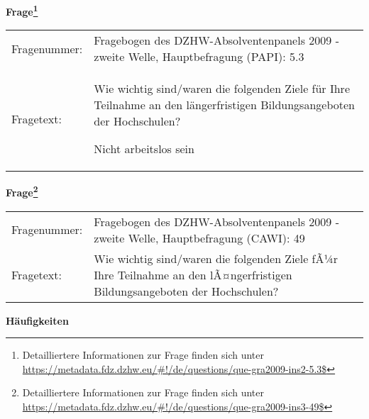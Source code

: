 				\vspace*{0.5cm}
                \noindent\textbf{Frage\footnote{Detailliertere Informationen zur Frage finden sich unter
		              \url{https://metadata.fdz.dzhw.eu/\#!/de/questions/que-gra2009-ins2-5.3$}}}\\
				\begin{tabularx}{\hsize}{@{}lX}
					Fragenummer: &
					  Fragebogen des DZHW-Absolventenpanels 2009 - zweite Welle, Hauptbefragung (PAPI):
					  5.3
 \\
					Fragetext: & Wie wichtig sind/waren die folgenden Ziele für Ihre Teilnahme an den längerfristigen Bildungsangeboten der Hochschulen?\par  Nicht arbeitslos sein \\
				\end{tabularx}
				\vspace*{0.5cm}
                \noindent\textbf{Frage\footnote{Detailliertere Informationen zur Frage finden sich unter
		              \url{https://metadata.fdz.dzhw.eu/\#!/de/questions/que-gra2009-ins3-49$}}}\\
				\begin{tabularx}{\hsize}{@{}lX}
					Fragenummer: &
					  Fragebogen des DZHW-Absolventenpanels 2009 - zweite Welle, Hauptbefragung (CAWI):
					  49
 \\
					Fragetext: & Wie wichtig sind/waren die folgenden Ziele fÃ¼r Ihre Teilnahme an den lÃ¤ngerfristigen Bildungsangeboten der Hochschulen? \\
				\end{tabularx}





        		\vspace*{0.5cm}
                \noindent\textbf{Häufigkeiten}

